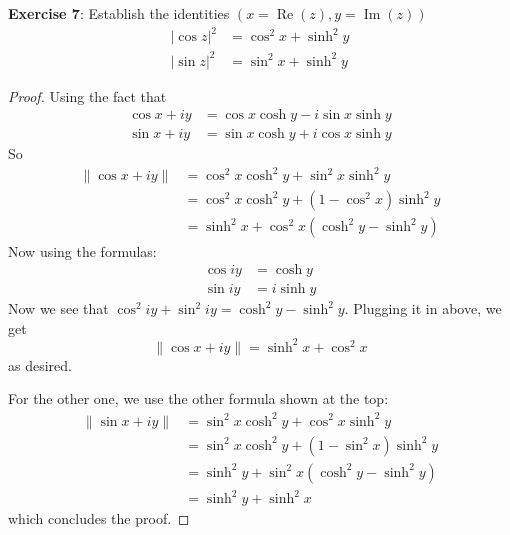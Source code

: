 \documentclass{article}
\begin{document}
\textbf{Exercise 7}: Establish the identities $(x = \mathop{Re}(z), y = \mathop{Im}(z))$
    \begin{align*}
        \lvert \cos{z} \rvert^{2} &= \cos^{2}{x} + \sinh^{2}{y} \\
        \lvert \sin{z} \rvert^{2} &= \sin^{2}{x} + \sinh^{2}{y}   
    \end{align*}
\begin{proof}
    Using the fact that 
        \begin{align*}
            \cos{x + iy} &= \cos{x}\cosh{y} - i\sin{x}\sinh{y} \\
            \sin{x + iy} &= \sin{x}\cosh{y} + i\cos{x}\sinh{y}   
        \end{align*}
    So 
        \begin{align*}
            \lVert \cos{x + iy} \rVert &= \cos^{2}{x}\cosh^{2}{y} + \sin^{2}{x}\sinh^{2}{y}       \\
                                       &= \cos^{2}{x}\cosh^{2}{y} + (1 - \cos^{2}{x})\sinh^{2}{y} \\
                                       &= \sinh^{2}{x} + \cos^{2}{x}(\cosh^{2}{y} - \sinh^{2}{y}) 
        \end{align*}
    Now using the formulas:
        \begin{align*}
            \cos{iy} &= \cosh{y}  \\
            \sin{iy} &= i\sinh{y}   
        \end{align*}
    Now we see that $\cos^{2}{iy} + \sin^{2}{iy} = \cosh^{2}{y} - \sinh^{2}{y}$. Plugging it in above, we get
        \begin{equation*}
            \lVert \cos{x + iy} \rVert = \sinh^{2}{x} + \cos^{2}{x}
        \end{equation*}
    as desired. 

    For the other one, we use the other formula shown at the top:
        \begin{align*}
            \lVert \sin{x + iy} \rVert &= \sin^{2}{x}\cosh^{2}{y} + \cos^{2}{x}\sinh^{2}{y}       \\
                                       &= \sin^{2}{x}\cosh^{2}{y} + (1 - \sin^{2}{x})\sinh^{2}{y} \\
                                       &= \sinh^{2}{y} + \sin^{2}{x}(\cosh^{2}{y} - \sinh^{2}{y}) \\
                                       &= \sinh^{2}{y} + \sinh^{2}{x}                               
        \end{align*}
    which concludes the proof.
\end{proof}
\end{document}
